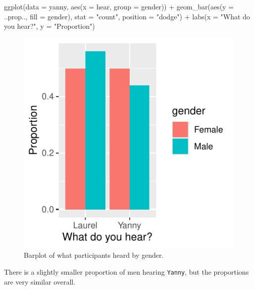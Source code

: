 \documentclass[
  letterpaper,
  DIV=11,
  numbers=noendperiod]{scrartcl}
\newenvironment{Shaded}{\begin{snugshade}}{\end{snugshade}}
\newcommand{\AttributeTok}[1]{\textcolor[rgb]{0.40,0.45,0.13}{#1}}
\newcommand{\FunctionTok}[1]{\textcolor[rgb]{0.28,0.35,0.67}{#1}}
\newcommand{\NormalTok}[1]{\textcolor[rgb]{0.00,0.23,0.31}{#1}}
\newcommand{\SpecialCharTok}[1]{\textcolor[rgb]{0.37,0.37,0.37}{#1}}
\newcommand{\StringTok}[1]{\textcolor[rgb]{0.13,0.47,0.30}{#1}}
\begin{document}
\begin{tcolorbox}
\begin{Shaded}
\begin{Highlighting}[]
\FunctionTok{ggplot}\NormalTok{(}\AttributeTok{data =}\NormalTok{ yanny, }\FunctionTok{aes}\NormalTok{(}\AttributeTok{x =}\NormalTok{ hear, }\AttributeTok{group =}\NormalTok{ gender)) }\SpecialCharTok{+}
  \FunctionTok{geom\_bar}\NormalTok{(}\FunctionTok{aes}\NormalTok{(}\AttributeTok{y =}\NormalTok{ ..prop.., }\AttributeTok{fill =}\NormalTok{ gender),}
           \AttributeTok{stat =} \StringTok{"count"}\NormalTok{, }\AttributeTok{position =} \StringTok{"dodge"}\NormalTok{) }\SpecialCharTok{+}
  \FunctionTok{labs}\NormalTok{(}\AttributeTok{x =} \StringTok{"What do you hear?"}\NormalTok{, }\AttributeTok{y =} \StringTok{"Proportion"}\NormalTok{)}
\end{Highlighting}
\end{Shaded}

\begin{figure}[H]

{\centering \includegraphics{about_files/figure-pdf/unnamed-chunk-5-1.pdf}

}

\caption{Barplot of what participants heard by gender.}

\end{figure}%

There is a slightly smaller proportion of men hearing \texttt{Yanny},
but the proportions are very similar overall.


\end{tcolorbox}
\end{document}
